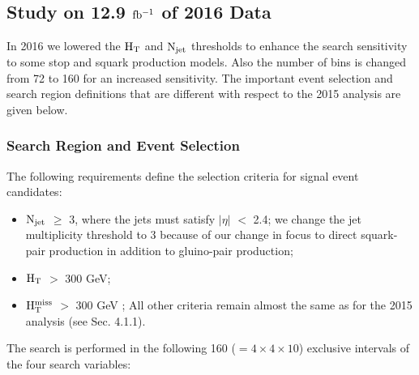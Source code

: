 \newpage
\subsection{Study on 12.9 $\rm fb^{-1}$ of 2016 Data}
In 2016 we lowered the $\rm H_{T}$ and $\rm N_{jet}$ thresholds to enhance the search sensitivity to some stop and squark production models. Also the number of bins is changed from 72 to 160 for an increased sensitivity. The important event selection and search region definitions that are different with respect to the 2015 analysis are given below. 
\subsubsection{Search Region and Event Selection}

The following requirements define the selection criteria for signal event candidates:
\begin{itemize}
\item $\rm N_{jet}$ $\geq$ 3, where the jets must satisfy $|\eta|$ $<$ 2.4; we change the jet multiplicity threshold to 3 because of our change in focus to direct squark-pair production in addition to gluino-pair production;
\item $\rm H_{T}$  $>$ 300 GeV;
\item $\rm H_{T}^{miss}$ $>$  300 GeV ;
All other criteria remain almost the same as for the 2015 analysis (see Sec. 4.1.1).

\end{itemize}
The search is performed in the following 160 ($=4\times4\times10$) exclusive intervals of the four search variables:
